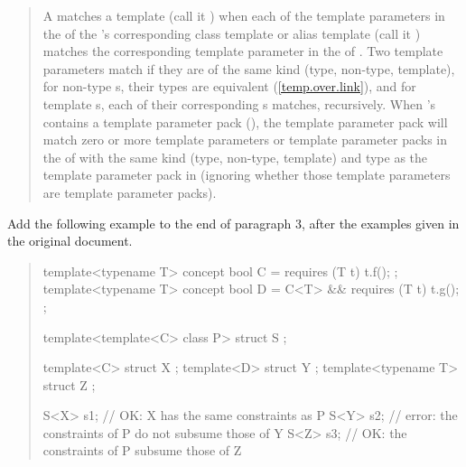 \begin{quote}
\setcounter{Paras}{2}
\pnum
A  matches  a template 
  (call it ) when each of the 
template parameters in the  of the 
's corresponding class template or alias 
template (call it  ) matches the corresponding template parameter in 
the  of .
% 
Two template parameters match if they are of the same kind (type, non-type, 
template), for non-type s, their types are 
equivalent (\ref{temp.over.link}), and for template 
s, each of their corresponding
s matches, recursively. 
% 
When 's  
contains a template parameter pack (), the template 
parameter pack will match zero or more template parameters or template 
parameter packs in the  of
 with the same kind (type, non-type, template) and type as the template 
parameter pack in  (ignoring whether those template parameters are
template parameter packs).
\end{quote}

Add the following example to the end of paragraph 3, after the
examples given in the original document.

\begin{quote}
\begin{addedblock}
\enterexample
\begin{codeblock}
template<typename T> concept bool C = requires (T t) { t.f(); };
template<typename T> concept bool D = C<T> && requires (T t) { t.g(); };

template<template<C> class P>
  struct S { };

template<C> struct X { };
template<D> struct Y { };
template<typename T> struct Z { };

S<X> s1; // OK: X has the same constraints as P
S<Y> s2; // error: the constraints of P do not subsume those of Y
S<Z> s3; // OK: the constraints of P subsume those of Z
\end{codeblock}
\exitexample
\end{addedblock}
\end{quote}


